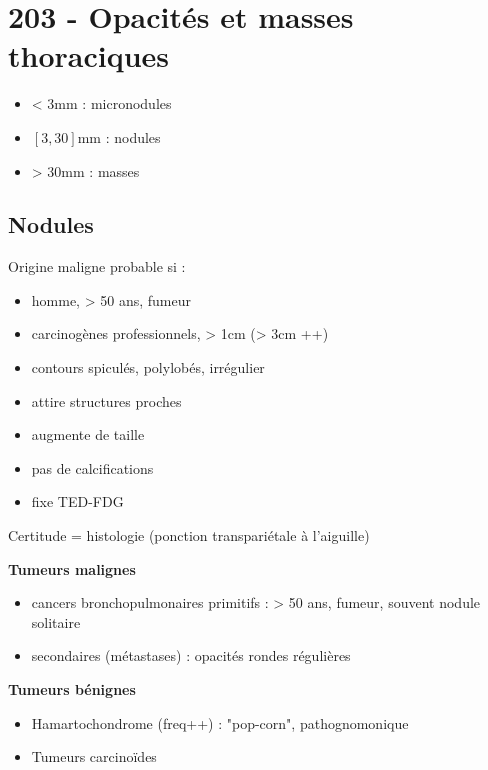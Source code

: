 \section{203 - Opacités et masses thoraciques}%
\label{sec:203_opacites_et_masses_thoraciques}

\begin{itemize}
\item < 3mm : micronodules
\item $[3,30]$mm : nodules
\item > 30mm : masses
\end{itemize}

\subsection{Nodules}
Origine maligne probable si :
\begin{itemize}
\item homme, > 50 ans, fumeur
\item carcinogènes professionnels, > 1cm (> 3cm ++)
\item contours spiculés, polylobés, irrégulier
\item attire structures proches
\item augmente de taille
\item pas de calcifications
\item fixe TED-FDG
\end{itemize}
Certitude = histologie (ponction transpariétale à l'aiguille)

\textbf{Tumeurs malignes}  
\begin{itemize}
\item cancers bronchopulmonaires primitifs : > 50 ans, fumeur, souvent nodule
  solitaire
\item secondaires (métastases) : opacités rondes régulières
\end{itemize}

\textbf{Tumeurs bénignes} 
\begin{itemize}
\item Hamartochondrome (freq++) : "pop-corn", pathognomonique
\item Tumeurs  carcinoïdes
\end{itemize}

